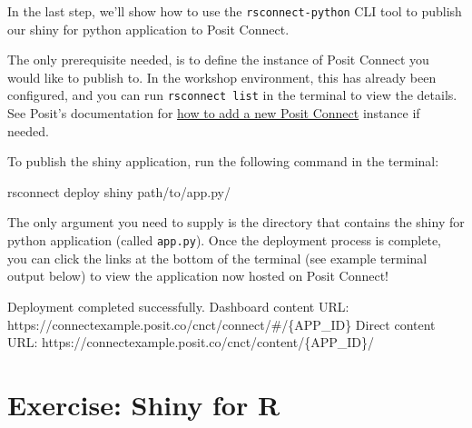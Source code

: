 \documentclass[
  letterpaper,
  DIV=11,
  numbers=noendperiod]{scrreprt}
\newenvironment{Shaded}{\begin{snugshade}}{\end{snugshade}}
\newcommand{\ExtensionTok}[1]{\textcolor[rgb]{0.00,0.23,0.31}{#1}}
\newcommand{\NormalTok}[1]{\textcolor[rgb]{0.00,0.23,0.31}{#1}}
\begin{document}
In the last step, we'll show how to use the \texttt{rsconnect-python}
CLI tool to publish our shiny for python application to Posit Connect.

The only prerequisite needed, is to define the instance of Posit Connect
you would like to publish to. In the workshop environment, this has
already been configured, and you can run \texttt{rsconnect\ list} in the
terminal to view the details. See Posit's documentation for
\href{https://docs.posit.co/rsconnect-python/\#remembering-server-information}{how
to add a new Posit Connect} instance if needed.

To publish the shiny application, run the following command in the
terminal:

\begin{Shaded}
\begin{Highlighting}[]
\ExtensionTok{rsconnect}\NormalTok{ deploy shiny path/to/app.py/}
\end{Highlighting}
\end{Shaded}

The only argument you need to supply is the directory that contains the
shiny for python application (called \texttt{app.py}). Once the
deployment process is complete, you can click the links at the bottom of
the terminal (see example terminal output below) to view the application
now hosted on Posit Connect!

\begin{Shaded}
\begin{Highlighting}[]
\ExtensionTok{Deployment}\NormalTok{ completed successfully.}
         \ExtensionTok{Dashboard}\NormalTok{ content URL: https://connectexample.posit.co/cnct/connect/\#/\{APP\_ID\}}
         \ExtensionTok{Direct}\NormalTok{ content URL: https://connectexample.posit.co/cnct/content/\{APP\_ID\}/}
\end{Highlighting}
\end{Shaded}

\chapter{Exercise: Shiny for R}\label{exercise-shiny-for-r}
\end{document}
